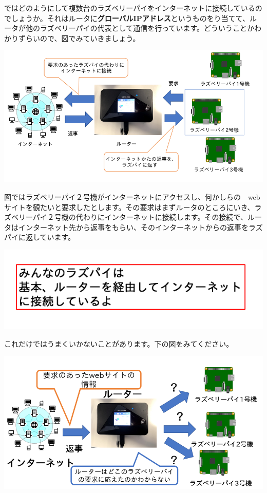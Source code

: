 \documentclass[a4paper,12pt,dvipdfmx]{jarticle}
\begin{document}
\bigskip

ではどのようにして複数台のラズベリーパイをインターネットに接続しているのでしょうか。それはルータに\textbf{グローバルIPアドレス}というものをり当てて、ルータが他のラズベリーパイの代表として通信を行っています。どういうことかわかりずらいので、図でみていきましょう。



\centering
\includegraphics[width=16.18cm]{ome7-img013.png}
\flushleft


\bigskip

図ではラズベリーパイ２号機がインターネットにアクセスし、何かしらの　webサイトを観たいと要求したとします。その要求はまずルータのところにいき、ラズベリーパイ２号機の代わりにインターネットに接続します。その接続で、ルータはインターネット先から返事をもらい、そのインターネットからの返事をラズパイに返しています。

\centering
\includegraphics[width=15.921cm]{ome7-img014.png}
\flushleft


\bigskip

\clearpage
これだけではうまくいかないことがあります。下の図をみてください。



\centering
\includegraphics[width=15.565cm]{ome7-img015.png}
\flushleft
\end{document}
